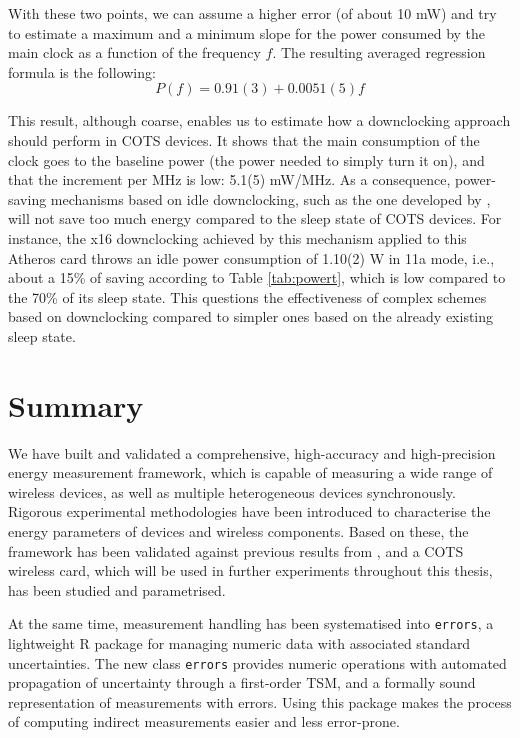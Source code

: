 \documentclass[twoside,nohyper]{tufte-book}
\begin{document}
With these two points, we can assume a higher error (of about 10 mW) and try to estimate a maximum and a minimum slope for the power consumed by the main clock as a function of the frequency \(f\). The resulting averaged regression formula is the following:
%
\begin{equation}
 P(f) = 0.91(3) + 0.0051(5)f \label{eq:Pf}
\end{equation}
%


This result, although coarse, enables us to estimate how a downclocking approach should perform in COTS devices. It shows that the main consumption of the clock goes to the baseline power (the power needed to simply turn it on), and that the increment per MHz is low: 5.1(5) mW/MHz. As a consequence, power-saving mechanisms based on idle downclocking, such as the one developed by \citet{Zhang2012}, will not save too much energy compared to the sleep state of COTS devices. For instance, the x16 downclocking achieved by this mechanism applied to this Atheros card throws an idle power consumption of 1.10(2) W in 11a mode, i.e., about a 15\% of saving according to Table \ref{tab:powert}, which is low compared to the 70\% of its sleep state. This questions the effectiveness of complex schemes based on downclocking compared to simpler ones based on the already existing sleep state.

\hypertarget{summary}{%
\section{Summary}\label{summary}}

We have built and validated a comprehensive, high-accuracy and high-precision energy measurement framework, which is capable of measuring a wide range of wireless devices, as well as multiple heterogeneous devices synchronously. Rigorous experimental methodologies have been introduced to characterise the energy parameters of devices and wireless components. Based on these, the framework has been validated against previous results from \citet{Serrano2014}, and a COTS wireless card, which will be used in further experiments throughout this thesis, has been studied and parametrised.

At the same time, measurement handling has been systematised into \texttt{errors}\cite[0pt]{contrib-03}, a lightweight R package for managing numeric data with associated standard uncertainties. The new class \texttt{errors} provides numeric operations with automated propagation of uncertainty through a first-order TSM, and a formally sound representation of measurements with errors. Using this package makes the process of computing indirect measurements easier and less error-prone.
\end{document}
